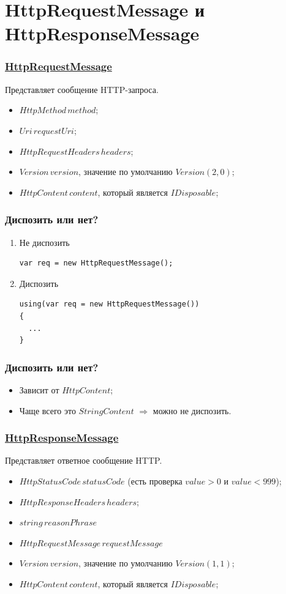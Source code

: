 \documentclass[17pt,aspectratio=169]{beamer}
\begin{document}
\section{HttpRequestMessage и HttpResponseMessage}
\begin{frame}
\frametitle{\href{https://docs.microsoft.com/en-us/dotnet/api/system.net.http.httprequestmessage?view=netcore-2.2}{HttpRequestMessage}}
Представляет сообщение HTTP-запроса. 
\begin{itemize}
	\item $HttpMethod\,method$;
	\item $Uri\,requestUri$;
	\item $HttpRequestHeaders\,headers$;
	\item $Version\,version$, значение по умолчанию $Version(2, 0)$;
	\item $HttpContent\,content$, который является $IDisposable$;
\end{itemize}
\end{frame}

\begin{frame}[fragile]
\frametitle{Диспозить или нет?}
\begin{enumerate}
	\item <1-> Не диспозить
\begin{lstlisting}
var req = new HttpRequestMessage();
\end{lstlisting}
	\item <2-> Диспозить
\begin{lstlisting}
using(var req = new HttpRequestMessage())
{
  ...                
}
\end{lstlisting}
\end{enumerate}
\end{frame}

\begin{frame}
\frametitle{Диспозить или нет?}
\begin{itemize}
	\item <1-> Зависит от $HttpContent$; 
	\item <2-> Чаще всего это $StringContent$ $\Rightarrow$ можно не диспозить.
\end{itemize}
\end{frame}

\begin{frame}
\frametitle{\href{https://docs.microsoft.com/en-us/dotnet/api/system.net.http.httpresponsemessage?view=netcore-2.2}{HttpResponseMessage}}
Представляет ответное сообщение HTTP.
\begin{itemize}
	\item $HttpStatusCode\,statusCode$ (есть проверка $value > 0$ и $value < 999$);
	\item $HttpResponseHeaders\,headers$;
	\item $string\,reasonPhrase$
	\item $HttpRequestMessage\,requestMessage$
	\item $Version\,version$, значение по умолчанию $Version(1, 1)$;
	\item $HttpContent\,content$, который является $IDisposable$;
\end{itemize}
\end{frame}
\end{document}
